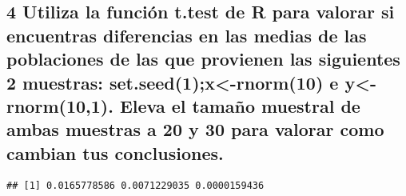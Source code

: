 \documentclass[
]{article}
\newenvironment{Shaded}{\begin{snugshade}}{\end{snugshade}}
\newcommand{\ControlFlowTok}[1]{\textcolor[rgb]{0.13,0.29,0.53}{\textbf{#1}}}
\newcommand{\DecValTok}[1]{\textcolor[rgb]{0.00,0.00,0.81}{#1}}
\newcommand{\FunctionTok}[1]{\textcolor[rgb]{0.00,0.00,0.00}{#1}}
\newcommand{\NormalTok}[1]{#1}
\newcommand{\OtherTok}[1]{\textcolor[rgb]{0.56,0.35,0.01}{#1}}
\newcommand{\SpecialCharTok}[1]{\textcolor[rgb]{0.00,0.00,0.00}{#1}}
\begin{document}
\hypertarget{utiliza-la-funciuxf3n-t.test-de-r-para-valorar-si-encuentras-diferencias-en-las-medias-de-las-poblaciones-de-las-que-provienen-las-siguientes-2-muestras-set.seed1x-rnorm10-e-y-rnorm101.-eleva-el-tamauxf1o-muestral-de-ambas-muestras-a-20-y-30-para-valorar-como-cambian-tus-conclusiones.}{%
\subsection{4 Utiliza la función t.test de R para valorar si encuentras
diferencias en las medias de las poblaciones de las que provienen las
siguientes 2 muestras: set.seed(1);x\textless-rnorm(10) e
y\textless-rnorm(10,1). Eleva el tamaño muestral de ambas muestras a 20
y 30 para valorar como cambian tus
conclusiones.}\label{utiliza-la-funciuxf3n-t.test-de-r-para-valorar-si-encuentras-diferencias-en-las-medias-de-las-poblaciones-de-las-que-provienen-las-siguientes-2-muestras-set.seed1x-rnorm10-e-y-rnorm101.-eleva-el-tamauxf1o-muestral-de-ambas-muestras-a-20-y-30-para-valorar-como-cambian-tus-conclusiones.}}

\begin{Shaded}
\end{Shaded}

\begin{verbatim}
## [1] 0.0165778586 0.0071229035 0.0000159436
\end{verbatim}
\end{document}
